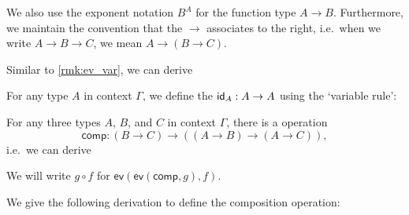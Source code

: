 \begin{rmk}
We also use the exponent notation $B^A$ for the function type $A\to B$. Furthermore, we maintain the convention that the $\to$ associates to the right, i.e.~when we write $A\to B\to C$, we mean $A\to (B\to C)$.
\end{rmk}

\begin{rmk}
Similar to \cref{rmk:ev_var}, we can derive
\begin{prooftree}
\end{prooftree}
\end{rmk}

\begin{defn}
For any type $A$ in context $\Gamma$, we define the  $\idfunc[A]:A\to A$ using the `variable rule':
\begin{prooftree}
\end{prooftree}
\end{defn}

\begin{defn}
For any three types $A$, $B$, and $C$ in context $\Gamma$, there is a  operation
\begin{equation*}
\mathsf{comp}:(B\to C)\to ((A\to B)\to (A\to C)),
\end{equation*}
i.e.~we can derive
\begin{prooftree}
\end{prooftree}
We will write $g\circ f$ for $\mathsf{ev}(\mathsf{ev}(\mathsf{comp},g),f)$.
\end{defn}

\begin{constr}
We give the following derivation to define the composition operation:
\begin{small}
\begin{prooftree}
\end{prooftree}
\end{small}
\end{constr}

